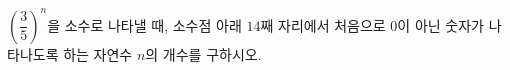 $\left(\dfrac{3}{5}\right)^{n}$을 소수로 나타낼 때, 소수점 아래 $14$째 자리에서 처음으로 $0$이 아닌 숫자가 나타나도록 하는 자연수 $n$의 개수를 구하시오. 
